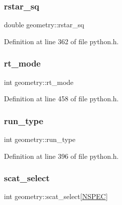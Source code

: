 \mbox{\label{structgeometry_a13ebfaefe1ef2d771f3f0a2277d74617}} 
\subsubsection{\texorpdfstring{rstar\+\_\+sq}{rstar\_sq}}
{\footnotesize\ttfamily double geometry\+::rstar\+\_\+sq}



Definition at line 362 of file python.\+h.

\mbox{\label{structgeometry_a27207d7b4e1bef1c57a659354ff5cee9}} 
\subsubsection{\texorpdfstring{rt\+\_\+mode}{rt\_mode}}
{\footnotesize\ttfamily int geometry\+::rt\+\_\+mode}



Definition at line 458 of file python.\+h.

\mbox{\label{structgeometry_af65bb6689e1945e975f6787825d2c5b8}} 
\subsubsection{\texorpdfstring{run\+\_\+type}{run\_type}}
{\footnotesize\ttfamily int geometry\+::run\+\_\+type}



Definition at line 396 of file python.\+h.

\mbox{\label{structgeometry_aaede16ca055dbc6f8297e4ed58c4082d}} 
\subsubsection{\texorpdfstring{scat\+\_\+select}{scat\_select}}
{\footnotesize\ttfamily int geometry\+::scat\+\_\+select\mbox{[}\hyperlink{python_8h_ade1df1cb82ae4ef9a5c0cddb37d9a73b}{N\+S\+P\+EC}\mbox{]}}



